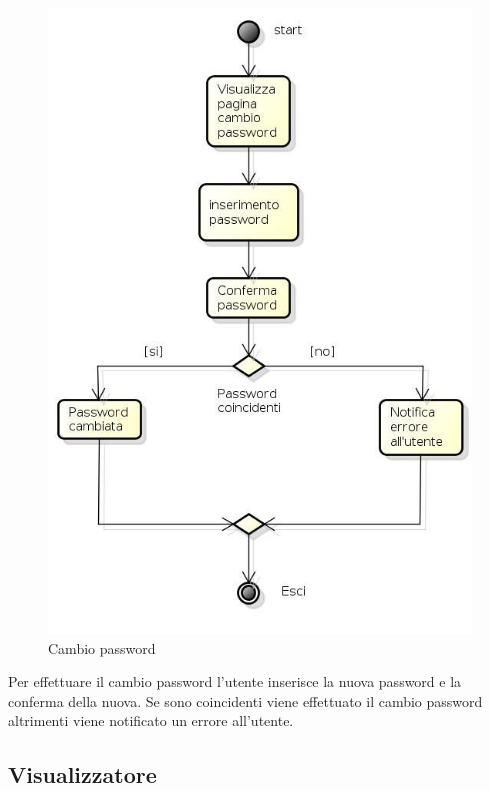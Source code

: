 \begin{figure}[h!]
		\centering
		\includegraphics[scale=.5]{img/Cambio_password.jpg}
		\caption{Cambio password}
		\label{fig:Cambio_password}
\end{figure}

Per effettuare il cambio password l'utente inserisce la nuova password e la conferma della nuova. Se sono coincidenti viene effettuato il cambio password altrimenti viene notificato un errore all'utente.

\newpage

\subsection{Visualizzatore}


